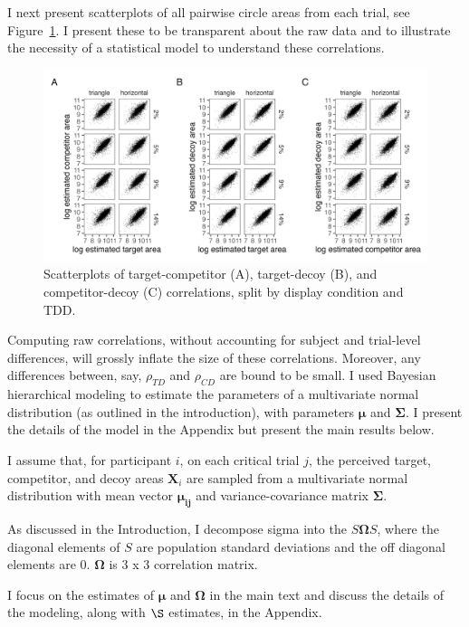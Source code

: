 I next present scatterplots of all pairwise circle areas from each trial, see Figure~\ref{fig:raw_cors}. I present these to be transparent about the raw data and to illustrate the necessity of a statistical model to understand these correlations. 

\begin{figure}
   \includegraphics[width=\textwidth]{figures/circleAreaPhase_cor_plot_all_no_outliers.jpg}
   \caption{Scatterplots of target-competitor (A), target-decoy (B), and competitor-decoy (C) correlations, split by display condition and TDD.}
   \label{fig:raw_cors}
\end{figure}

Computing raw correlations, without accounting for subject and trial-level differences, will grossly inflate the size of these correlations. Moreover, any differences between, say, $\rho_{TD}$ and $\rho_{CD}$ are bound to be small. I used Bayesian hierarchical modeling to estimate the parameters of a multivariate normal distribution (as outlined in the introduction), with parameters $\boldsymbol{\mu}$ and $\boldsymbol{\Sigma}$. I present the details of the model in the Appendix but present the main results below.

I assume that, for participant $i$, on each critical trial $j$, the perceived target, competitor, and decoy areas $\mathbf{X}_i$ are sampled from a multivariate normal distribution with mean vector $\boldsymbol{\mu_{ij}}$ and variance-covariance matrix $\boldsymbol{\Sigma}$. 

As discussed in the Introduction, I decompose sigma into the $S\boldsymbol{\Omega}S$, where the diagonal elements of $S$ are population standard deviations and the off diagonal elements are $0$. $\boldsymbol{\Omega}$ is 3 x 3 correlation matrix.  

I focus on the estimates of $\boldsymbol{\mu}$ and $\boldsymbol{\Omega}$ in the main text and discuss the details of the modeling, along with $\S$ estimates, in the Appendix. 

